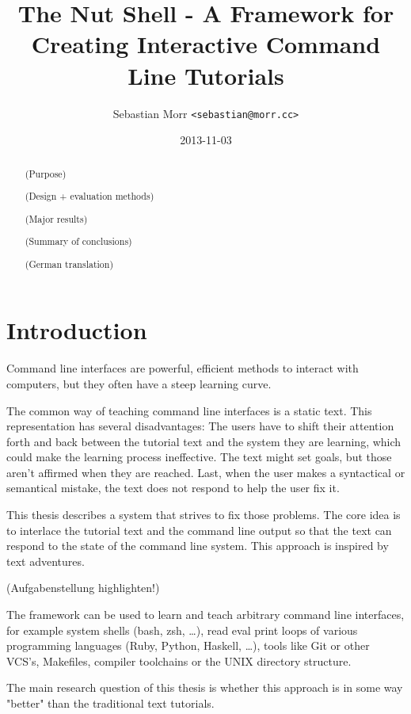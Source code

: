 \documentclass[twoside]{scrreprt}
\title{The Nut Shell - A Framework for Creating Interactive Command Line Tutorials}
\author{Sebastian Morr \texttt{<sebastian@morr.cc>}}
\date{2013-11-03}
\begin{document}
\maketitle

\begin{abstract}
    (Purpose)

    (Design + evaluation methods)

    (Major results)

    (Summary of conclusions)

    \vspace{8em}

    (German translation)
\end{abstract}

\setcounter{tocdepth}{1}
\tableofcontents

\chapter{Introduction}

Command line interfaces are powerful, efficient methods to interact with computers, but they often have a steep learning curve.

The common way of teaching command line interfaces is a static text. This representation has several disadvantages: The users have to shift their attention forth and back between the tutorial text and the system they are learning, which could make the learning process ineffective. The text might set goals, but those aren't affirmed when they are reached. Last, when the user makes a syntactical or semantical mistake, the text does not respond to help the user fix it.

This thesis describes a system that strives to fix those problems. The core idea is to interlace the tutorial text and the command line output so that the text can respond to the state of the command line system. This approach is inspired by text adventures.

(Aufgabenstellung highlighten!)

The framework can be used to learn and teach arbitrary command line interfaces, for example system shells (bash, zsh, …), read eval print loops of various programming languages (Ruby, Python, Haskell, …), tools like Git or other VCS's, Makefiles, compiler toolchains or the UNIX directory structure.

The main research question of this thesis is whether this approach is in some way "better" than the traditional text tutorials.
\end{document}
